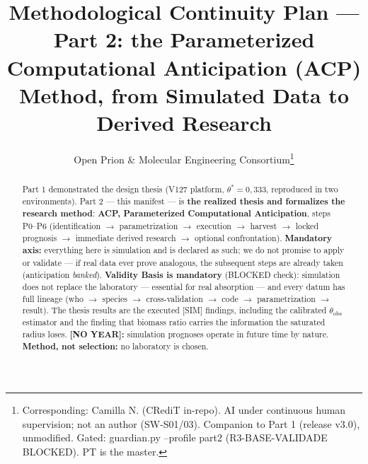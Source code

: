 \documentclass[10pt,twocolumn]{article}
\title{\bfseries Methodological Continuity Plan — Part 2: the Parameterized Computational Anticipation (ACP) Method, from Simulated Data to Derived Research}
\author{\normalsize Open Prion \& Molecular Engineering Consortium\thanks{Corresponding: Camilla N. (CRediT in-repo). AI under continuous human supervision; not an author (SW-S01/03). Companion to Part 1 (release v3.0), unmodified. Gated: guardian.py --profile part2 (R3-BASE-VALIDADE BLOCKED). PT is the master.}}
\date{}
\begin{document}
\maketitle
\begin{abstract}\small
Part 1 demonstrated the design thesis (V127 platform, $\theta^{*}{=}0{,}333$, reproduced in two environments). Part 2 — this manifest — is \textbf{the realized thesis and formalizes the research method}: \textbf{ACP, Parameterized Computational Anticipation}, steps P0--P6 (identification $\to$ parametrization $\to$ execution $\to$ harvest $\to$ locked prognosis $\to$ immediate derived research $\to$ optional confrontation). \textbf{Mandatory axis:} everything here is simulation and is declared as such; we do not promise to apply or validate — if real data ever prove analogous, the subsequent steps are already taken (anticipation \emph{banked}). \textbf{Validity Basis is mandatory} (BLOCKED check): simulation does not replace the laboratory — essential for real absorption — and every datum has full lineage (who $\to$ species $\to$ cross-validation $\to$ code $\to$ parametrization $\to$ result). The thesis results are the executed [SIM] findings, including the calibrated $\theta_{\text{obs}}$ estimator and the finding that biomass ratio carries the information the saturated radius loses. \textbf{[NO YEAR]:} simulation prognoses operate in future time by nature. \textbf{Method, not selection:} no laboratory is chosen.
\end{abstract}
\end{document}
